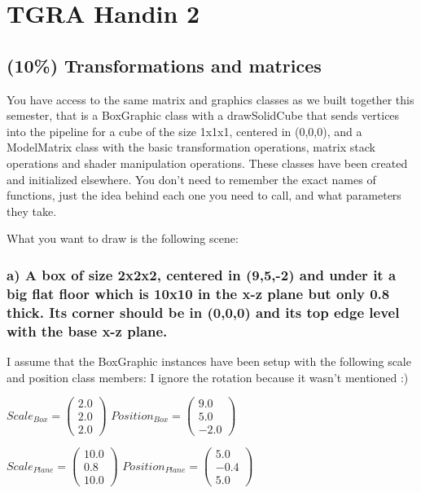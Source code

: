 \section{TGRA Handin 2}

\subsection{(10\%) Transformations and matrices}
You have access to  the same matrix and graphics classes as we built together this semester, that is a BoxGraphic class with a drawSolidCube that sends vertices into the pipeline for a cube of the size 1x1x1, centered in (0,0,0), and a ModelMatrix class with the basic transformation operations, matrix stack operations and shader manipulation operations. These classes have been created and initialized elsewhere.  You don’t need to remember the exact names of functions, just the idea behind each one you need to call, and what parameters they take. 

What you want to draw is the following scene: 

\subsubsection{a) A box of size 2x2x2, centered in (9,5,-2) and under it a big flat floor which is 10x10 in the x-z plane but only 0.8 thick.  Its corner should be in (0,0,0) and its top edge level with the base x-z plane.}

I assume that the BoxGraphic instances have been setup with the following scale and position class members: I ignore the rotation because it wasn't mentioned :)

$ Scale_{Box} = \left(\begin{array}{c}2.0\\2.0\\2.0\end{array}\right)$
$ Position_{Box} = \left(\begin{array}{c}9.0\\5.0\\-2.0\end{array}\right)$

$ Scale_{Plane} = \left(\begin{array}{c}10.0\\0.8\\10.0\end{array}\right)$
$ Position_{Plane} = \left(\begin{array}{c}5.0\\-0.4\\5.0\end{array}\right)$

